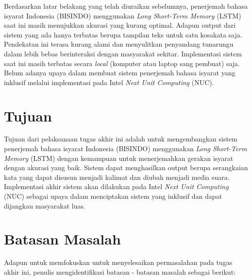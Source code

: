 Berdasarkan latar belakang yang telah diuraikan sebelumnya, penerjemah bahasa isyarat Indonesia (BISINDO) menggunakan \emph{Long Short-Term Memory} (LSTM) saat ini masih menujukkan akurasi yang kurang optimal. Adapun output dari sistem yang ada hanya terbatas berupa tampilan teks untuk satu kosakata saja. Pendekatan ini terasa kurang alami dan menyulitkan penyandang tunarungu dalam lebih bebas berinteraksi dengan masyarakat sekitar. Implementasi sistem saat ini masih terbatas secara \emph{local} (komputer atau laptop sang pembuat) saja. Belum adanya upaya dalam membuat sistem penerjemah bahasa isyarat yang inklusif melalui implementasi pada Intel \emph{Next Unit Computing} (NUC).    

\section{Tujuan}
\label{sec:Tujuan}


Tujuan dari pelaksanaan tugas akhir ini adalah untuk mengembangkan sistem penerjemah bahasa isyarat Indonesia (BISINDO) menggunakan \emph{Long Short-Term Memory} (LSTM) dengan kemampuan untuk menerjemahkan gerakan isyarat dengan akurasi yang baik. Sistem dapat menghasilkan output berupa serangkaian kata yang dapat disusun menjadi kalimat dan diubah menjadi media suara. Implementasi akhir sistem akan dilakukan pada Intel \emph{Next Unit Computing} (NUC) sebagai upaya dalam menciptakan sistem yang inklusif dan dapat dijangkau masyarakat luas.

\newpage

\section{Batasan Masalah}
\label{sec:batasanmasalah}

Adapun untuk memfokuskan untuk menyelesaikan permasalahan pada tugas akhir ini, penulis mengidentifikasi batasan - batasan masalah sebagai berikut:

